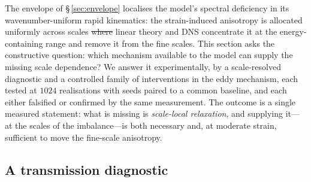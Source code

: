 \documentclass[lineno]{JFM-FLM_Au}
\providecommand{\DIFadd}[1]{{\protect\color{blue}\uwave{#1}}} %
\providecommand{\DIFdel}[1]{{\protect\color{red}\sout{#1}}} %
\providecommand{\DIFaddbegin}{} %
\providecommand{\DIFaddend}{} %
\providecommand{\DIFdelbegin}{} %
\providecommand{\DIFdelend}{} %
\begin{document}
The envelope of \S\,\ref{sec:envelope} localises the model's spectral
deficiency in its wavenumber-uniform rapid kinematics: the strain-induced
anisotropy is allocated uniformly across scales \DIFdelbegin \DIFdel{where }\DIFdelend \DIFaddbegin \DIFadd{while }\DIFaddend linear theory and
DNS concentrate it at the energy-containing range and remove it from the
fine scales. This section asks the constructive question: which mechanism
available to the model can supply the missing scale dependence? We answer
it experimentally, by a scale-resolved diagnostic and a controlled family
of interventions in the eddy mechanism, each tested at $1024$
realisations with seeds paired to a common baseline, and each either
falsified or confirmed by the same measurement. The outcome is a single
measured statement: what is missing is \emph{scale-local relaxation}, and
supplying it---at the scales of the imbalance---is both necessary and, at
moderate strain, sufficient to move the fine-scale anisotropy.

\subsection{A transmission diagnostic}\label{sec:transmission}
\end{document}

